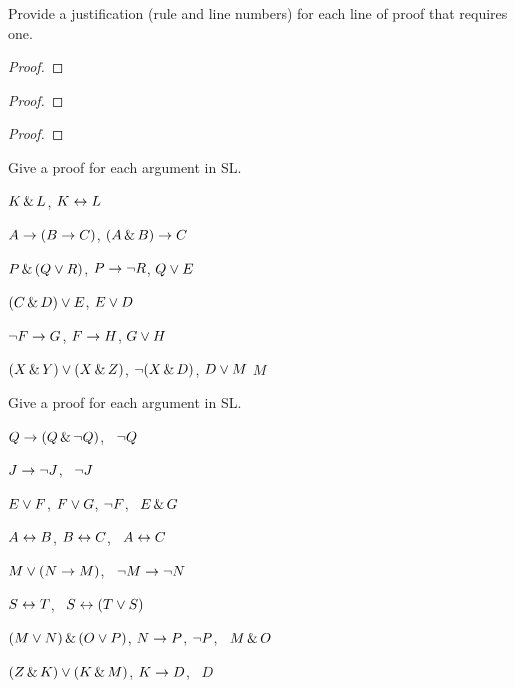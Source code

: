 \solutions
\problempart
\label{pr.justifySLproof}
Provide a justification (rule and line numbers) for each line of proof that requires one.
\begin{multicols}{2}
\begin{proof}
 {}
 {}
\end{proof}

\begin{proof}
\open
\close
{}
\end{proof}

\begin{proof}
\open
	 {}
	\open
	\close
\close
{}
\end{proof}
\end{multicols}

\solutions
\problempart
\label{pr.solvedSLproofs}
Give a proof for each argument in SL.
\begin{earg}
\item $K\,\&\, L$, \therefore $K\leftrightarrow L$
\item $A\rightarrow (B\rightarrow C)$, \therefore $(A\,\&\, B)\rightarrow C$
\item $P \,\&\, (Q\vee R)$, $P\rightarrow \neg R$, \therefore $Q\vee E$
\item $(C\,\&\, D)\vee E$, \therefore $E\vee D$
\item $\neg F\rightarrow G$, $F\rightarrow H$, \therefore $G\vee H$
\item $(X\,\&\, Y)\vee(X\,\&\, Z)$, $\neg(X\,\&\, D)$, $D\vee M$ \therefore $M$
\end{earg}

\problempart
Give a proof for each argument in SL.
\begin{earg}
\item $Q\rightarrow(Q\,\&\,\neg Q)$, \therefore\ $\neg Q$
\item $J\rightarrow\neg J$, \therefore\ $\neg J$
\item $E\vee F$, $F\vee G$, $\neg F$, \therefore\ $E \,\&\, G$
\item $A\leftrightarrow B$, $B\leftrightarrow C$, \therefore\ $A\leftrightarrow C$
\item $M\vee(N\rightarrow M)$, \therefore\ $\neg M \rightarrow \neg N$
\item $S\leftrightarrow T$, \therefore\ $S\leftrightarrow (T\vee S)$
\item $(M \vee N) \,\&\, (O \vee P)$, $N \rightarrow P$, $\neg P$, \therefore\ $M\,\&\, O$
\item $(Z\,\&\, K) \vee (K\,\&\, M)$, $K \rightarrow D$, \therefore\ $D$
\end{earg}



